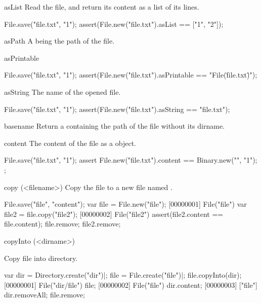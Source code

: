 \begin{urbiscriptapi}
\item[asList]
  Read the file, and return its content as a list of its lines.
\begin{urbiscript}
File.save("file.txt", "1\n");
assert(File.new("file.txt").asList == ["1", "2"]);
\end{urbiscript}

\item[asPath] A  being the path of the file.

\item[asPrintable]
\begin{urbiscript}
File.save("file.txt", "1\n");
assert(File.new("file.txt").asPrintable == "File(\"file.txt\")");
\end{urbiscript}

\item[asString]
  The name of the opened file.
\begin{urbiscript}
File.save("file.txt", "1\n");
assert(File.new("file.txt").asString == "file.txt");
\end{urbiscript}

\item[basename]
  Return a  containing the path of the file without
  its dirname.

\item[content]
  The content of the file as a  object.
\begin{urbiscript}
File.save("file.txt", "1\n");
assert
{
  File.new("file.txt").content == Binary.new("", "1\n");
};
\end{urbiscript}

\item[copy](<filename>)
  Copy the file to a new file named .
\begin{urbiscript}
File.save("file", "content");
var file = File.new("file");
[00000001] File("file")
var file2 = file.copy("file2");
[00000002] File("file2")
assert(file2.content == file.content);
file.remove;
file2.remove;
\end{urbiscript}

\item[copyInto](<dirname>)
  \experimental{}

  Copy file into  directory.
\begin{urbiscript}
var dir = Directory.create("dir")|;
file = File.create("file")|;
file.copyInto(dir);
[00000001] File("dir/file")
file;
[00000002] File("file")
dir.content;
[00000003] ["file"]
dir.removeAll;
file.remove;
\end{urbiscript}


\end{urbiscriptapi}

